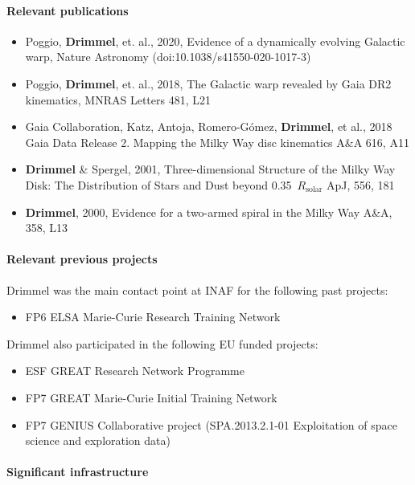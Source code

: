\paragraph{Relevant publications}
\begin{itemize}
    \item Poggio, \textbf{Drimmel}, et. al., 2020, Evidence of a dynamically evolving Galactic warp, Nature Astronomy (doi:10.1038/s41550-020-1017-3)
    \item Poggio, \textbf{Drimmel}, et. al., 2018, The Galactic warp revealed by Gaia DR2 kinematics, MNRAS Letters 481, L21
    \item  Gaia Collaboration, Katz, Antoja, Romero-G\'omez, \textbf{Drimmel}, et al., 2018 Gaia Data Release 2. Mapping the Milky Way disc kinematics A\&A 616, A11
    \item \textbf{Drimmel} \& Spergel, 2001, Three-dimensional Structure of the Milky Way Disk: The Distribution of Stars and Dust beyond 0.35~$R_\mathrm{solar}$ ApJ, 556, 181
    \item \textbf{Drimmel}, 2000, Evidence for a two-armed spiral in the Milky Way A\&A, 358, L13
\end{itemize}

\paragraph{Relevant previous projects}

Drimmel was the main contact point at INAF for the following past projects:
\begin{itemize}
    \item FP6 ELSA Marie-Curie Research Training Network
\end{itemize}
Drimmel also participated in the following EU funded projects: 
\begin{itemize}
    \item ESF GREAT Research Network Programme 
    \item FP7 GREAT Marie-Curie Initial Training Network
    \item FP7 GENIUS Collaborative project (SPA.2013.2.1-01 Exploitation of space science and exploration data)
\end{itemize}


\paragraph{Significant infrastructure}